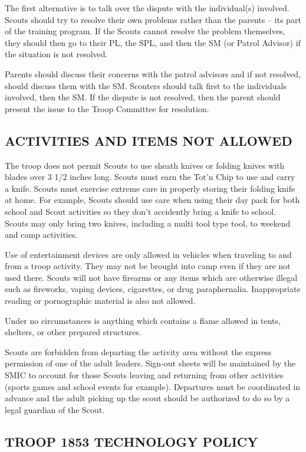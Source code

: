 \documentclass{ltxguide}
\begin{document}
The first alternative is to talk over the dispute with the individual(s) involved.
Scouts should try to resolve their own problems rather than the parents -- its part of the training program. If the Scouts cannot resolve the problem themselves, they should then go to their \ac{PL}, the \ac{SPL}, and then the \ac{SM} (or Patrol Advisor) if the situation is not resolved.

Parents should discuss their concerns with the patrol advisors and if not resolved, should discuss them with the \ac{SM}. Scouters should talk first to the individuals involved, then the \ac{SM}. If the dispute is not resolved, then the parent should present the issue to the Troop Committee for resolution.

\subsection{ACTIVITIES AND ITEMS NOT ALLOWED}
The troop does not permit Scouts to use sheath knives or folding knives with blades over 3 1/2 inches long. Scouts must earn the Tot'n Chip to use and carry a knife. Scouts must exercise extreme care in properly storing their folding knife at home. For example, Scouts should use care when using their day pack for both school and Scout activities so they don't accidently bring a knife to school. Scouts may only bring two knives, including a multi tool type tool, to weekend and camp activities.

Use of entertainment devices are only allowed in vehicles when traveling to and from a troop activity. They may not be brought into camp even if they are not used there. Scouts will not have firearms or any items which are otherwise illegal such as fireworks, vaping  devices, cigarettes, or drug paraphernalia. Inappropriate reading or pornographic material is  also not allowed.

Under no circumstances is anything which contains a flame allowed in tents, shelters, or other prepared structures.

Scouts are forbidden from departing the activity area without the express permission of one of the adult leaders. Sign-out sheets will be maintained by the SMIC to account for those Scouts leaving and returning from other activities (sports games and school events for example). Departures must be coordinated in advance and the adult picking up the scout should be authorized to do so by a legal guardian of the Scout.

\subsection{TROOP 1853 TECHNOLOGY POLICY}
\end{document}
